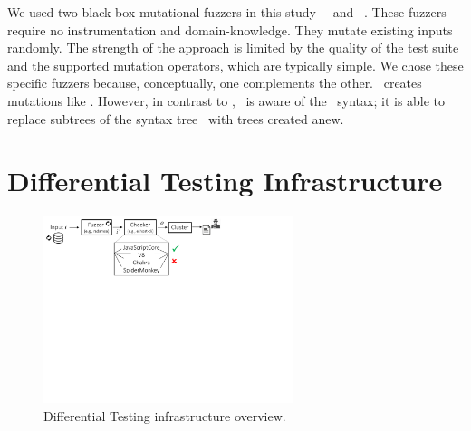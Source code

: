 \documentclass[10pt,conference,anonymous]{IEEEtran}
\begin{document}
We used two black-box mutational fuzzers in this
study--\radamsa~\cite{radamsa} and \quickfuzz~\cite{quickfuzz}. These
fuzzers require no instrumentation and domain-knowledge. They mutate
existing inputs randomly. The strength of the approach is
limited by the quality of the test suite and the supported mutation
operators, which are typically simple. We chose these specific fuzzers
because, conceptually, one complements the other. \quickfuzz\ creates
mutations like \radamsa. However, in contrast to \radamsa, \quickfuzz\ is aware
of the \js\ syntax; it is able to replace subtrees of the syntax
tree~\cite{grieco2016quickfuzz} with trees created anew.

\section{Differential Testing Infrastructure}
\label{sec:design}

\begin{figure}[t!]
  \centering
  \includegraphics[trim=0 350 0 0,clip,width=0.65\textwidth]{diff-testing-runtimes}
  \caption{\label{fig:workflow}Differential Testing infrastructure overview.}
\end{figure}

\end{document}
